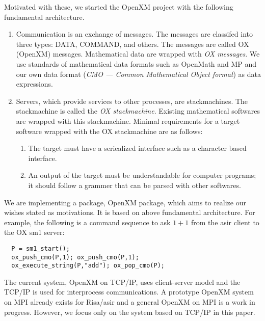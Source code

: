Motivated with these, we started the OpenXM project with the following
fundamental architecture.
\begin{enumerate}
\item Communication is an exchange of messages. The messages are classifed into
three types:
DATA, COMMAND, and others.
The messages are called OX (OpenXM) messages.
Mathematical data are wrapped with {\it OX messages}.
We use standards of mathematical data formats such as OpenMath and MP
and our own data format ({\it CMO --- Common Mathematical Object format})
as data expressions.
\item Servers, which provide services to other processes, are stackmachines.
The stackmachine is called the
{\it OX stackmachine}.
Existing mathematical softwares are wrapped with this stackmachine.
Minimal requirements for a target software wrapped with the OX stackmachine
are as follows:
\begin{enumerate}
\item The target must have a seriealized interface such as a character based
interface.
\item An output of the target must be understandable for computer programs;
it should follow a grammer that can be parsed with other softwares.
\end{enumerate}
\end{enumerate}
We are implementing a package, OpenXM package,  
which aims to realize our wishes stated as motivations.
It is based on above fundamental architecture.
For example, the following is a command sequence to ask $1+1$ from
the asir client to the OX sm1 server:
\begin{verbatim}
  P = sm1_start();
  ox_push_cmo(P,1); ox_push_cmo(P,1);
  ox_execute_string(P,"add"); ox_pop_cmo(P);
\end{verbatim}
The current system, OpenXM on TCP/IP, 
uses client-server model and the TCP/IP is used for interprocess
communications.
A prototype OpenXM system on MPI \cite{MPI} already exists for Risa/asir and
a general OpenXM on MPI is a work in progress.
However, we focus only on the system based on TCP/IP in this paper.



